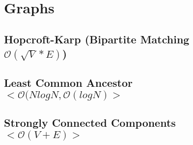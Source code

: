 \documentclass[10pt, a4paper, twoside, notitlepage]{article}
\begin{document}
\begin{titlepage}
\maketitle
\tableofcontents
\end{titlepage}


%
%
%

\section{Graphs}

\subsection{Hopcroft-Karp (Bipartite Matching $\mathcal{O}(\sqrt{V}*E)$)}



\newpage

\subsection{Least Common Ancestor $<\mathcal{O}(N logN, \mathcal{O}(logN)>$}



\newpage

\subsection{Strongly Connected Components $<\mathcal{O}(V+E)>$}



\newpage
\end{document}
